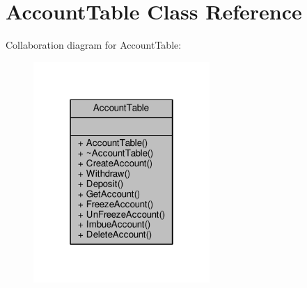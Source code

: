 \hypertarget{classAccountTable}{\section{Account\-Table Class Reference}
\label{classAccountTable}
}


Collaboration diagram for Account\-Table\-:
\nopagebreak
\begin{figure}[H]
\begin{center}
\leavevmode
\includegraphics[width=190pt]{classAccountTable__coll__graph}
\end{center}
\end{figure}
